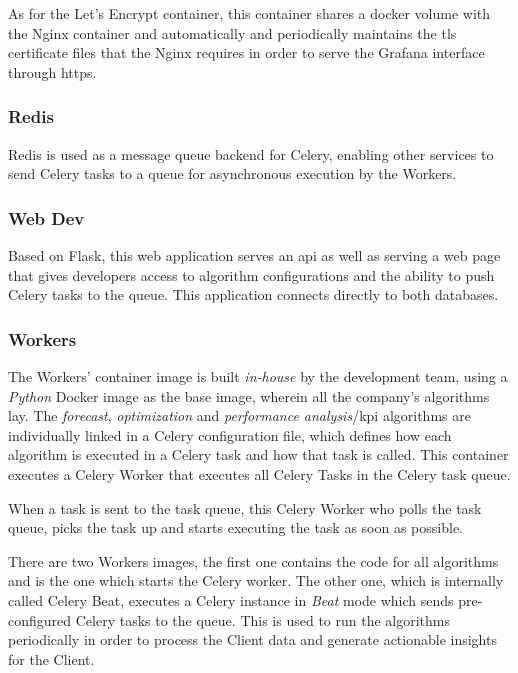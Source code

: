 As for the Let's Encrypt container, this container shares a docker volume with the Nginx container and automatically and periodically maintains the \gls{tls} certificate files that the Nginx requires in order to serve the Grafana interface through \gls{https}. 


\subsubsection{Redis}\label{methodology:sss:redis}

Redis is used as a message queue backend for Celery, enabling other services to send Celery tasks to a queue for asynchronous execution by the Workers.

\subsubsection{Web Dev}\label{methodology:sss:webdev}

Based on Flask, this web application serves an \gls{api} as well as serving a web page that gives developers access to algorithm configurations and the ability to push Celery tasks to the queue. This application connects directly to both databases.

\subsubsection{Workers}\label{methodology:sss:workers}

The Workers' container image is built \textit{in-house} by the development team, using a \textit{Python} Docker image as the base image, wherein all the company's algorithms lay. The \textit{forecast}, \textit{optimization} and \textit{performance analysis}/\gls{kpi} algorithms are individually linked in a Celery configuration file, which defines how each algorithm is executed in a Celery task and how that task is called. This container executes a Celery Worker that executes all Celery Tasks in the Celery task queue.

When a task is sent to the task queue, this Celery Worker who polls the task queue, picks the task up and starts executing the task as soon as possible.

There are two Workers images, the first one contains the code for all algorithms and is the one which starts the Celery worker. The other one, which is internally called Celery Beat, executes a Celery instance in \textit{Beat} mode which sends pre-configured Celery tasks to the queue. This is used to run the algorithms periodically in order to process the Client data and generate actionable insights for the Client.

